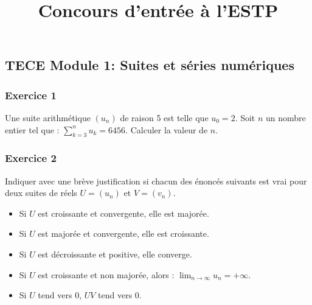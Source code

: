 \documentclass{article}
\title{Concours d'entrée à l'ESTP}
\date{}
\begin{document}
  \lstset{
    frame       = single,
    numbers     = left,
    showspaces  = false,
    showstringspaces    = false,
    captionpos  = t,
    caption     = \lstname
}
\begin{center}
\section*{TECE Module 1: Suites et séries numériques}
\end{center}

\subsubsection*{Exercice 1}
Une suite arithmétique $(u_n)$ de raison 5 est telle que $u_0=2$. Soit $n$ un nombre entier tel que : $\sum_{k=3}^nu_k=6456$. Calculer la valeur de $n$.
\subsubsection*{Exercice 2}
Indiquer avec une brève justification si chacun des énoncés suivants est vrai pour deux suites de réels $U=(u_n)$ et $V=(v_n)$.
\begin{itemize}
\item  Si $U$ est croissante et convergente, elle est majorée.
\item   Si $U$ est majorée et convergente, elle est croissante.
\item   Si $U$ est décroissante et positive, elle converge.
\item   Si $U$ est croissante et non majorée, alors : $\lim_{n\to\infty}u_n=+\infty$.
\item   Si $U$ tend vers 0, $UV$ tend vers 0.
\end{itemize}
\end{document}
